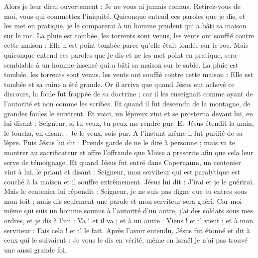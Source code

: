 \begin{multicols}{2}
Alors je leur dirai ouvertement : Je ne vous ai jamais connus. Retirez-vous de moi, vous qui commettez l'iniquité.
Quiconque entend ces paroles que je dis, et les met en pratique, je le comparerai à un homme prudent qui a bâti sa maison sur le roc.
La pluie est tombée, les torrents sont venus, les vents ont soufflé contre cette maison : Elle n'est point tombée parce qu'elle était fondée sur le roc.
Mais quiconque entend ces paroles que je dis et ne les met point en pratique, sera semblable à un homme insensé qui a bâti sa maison sur le sable.
La pluie est tombée, les torrents sont venus, les vents ont soufflé contre cette maison : Elle est tombée et sa ruine a été grande.
Or il arriva que quand Jésus eut achevé ce discours, la foule fut frappée de sa doctrine ;
car il les enseignait comme ayant de l'autorité et non comme les scribes.
\VerseOne{}Et quand il fut descendu de la montagne, de grandes foules le suivirent.
Et voici, un lépreux vint et se prosterna devant lui, en lui disant : Seigneur, si tu veux, tu peux me rendre pur.
Et Jésus étendit la main, le toucha, en disant : Je le veux, sois pur. A l'instant même il fut purifié de sa lèpre.
Puis Jésus lui dit : Prends garde de ne le dire à personne ; mais va te montrer au sacrificateur et offre l'offrande que Moïse a prescrite afin que cela leur serve de témoignage.
Et quand Jésus fut entré dans Capernaüm, un centenier vint à lui, le priant
et disant : Seigneur, mon serviteur qui est paralytique est couché à la maison et il souffre extrêmement.
Jésus lui dit : J'irai et je le guérirai.
Mais le centenier lui répondit : Seigneur, je ne suis pas digne que tu entres sous mon toit ; mais dis seulement une parole et mon serviteur sera guéri.
Car moi-même qui suis un homme soumis à l'autorité d'un autre, j'ai des soldats sous mes ordres, et je dis à l'un : Va ! et il va ; et à un autre : Viens ! et il vient ; et à mon serviteur : Fais cela ! et il le fait.
Après l'avoir entendu, Jésus fut étonné et dit à ceux qui le suivaient : Je vous le dis en vérité, même en Israël je n'ai pas trouvé une aussi grande foi.

\end{multicols}
